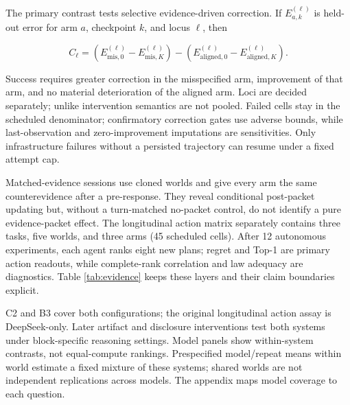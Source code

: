\documentclass{article}
\begin{document}
The primary contrast tests selective evidence-driven correction. If
\(E_{a,k}^{(\ell)}\) is held-out error for arm \(a\), checkpoint \(k\),
and locus \(\ell\), then

\[
C_{\ell}=\left(E^{(\ell)}_{\mathrm{mis},0}-E^{(\ell)}_{\mathrm{mis},K}\right)
-\left(E^{(\ell)}_{\mathrm{aligned},0}-E^{(\ell)}_{\mathrm{aligned},K}\right).
\]

Success requires greater correction in the misspecified arm, improvement
of that arm, and no material deterioration of the aligned arm. Loci are
decided separately; unlike intervention semantics are not pooled. Failed
cells stay in the scheduled denominator; confirmatory correction gates
use adverse bounds, while last-observation and zero-improvement
imputations are sensitivities. Only infrastructure failures without a
persisted trajectory can resume under a fixed attempt cap.

Matched-evidence sessions use cloned worlds and give every arm the same
counterevidence after a pre-response. They reveal conditional
post-packet updating but, without a turn-matched no-packet control, do
not identify a pure evidence-packet effect. The longitudinal action
matrix separately contains three tasks, five worlds, and three arms (45
scheduled cells). After 12 autonomous experiments, each agent ranks
eight new plans; regret and Top-1 are primary action readouts, while
complete-rank correlation and law adequacy are diagnostics. Table
\ref{tab:evidence} keeps these layers and their claim boundaries
explicit.

C2 and B3 cover both configurations; the original longitudinal action
assay is DeepSeek-only. Later artifact and disclosure interventions test
both systems under block-specific reasoning settings. Model panels show
within-system contrasts, not equal-compute rankings. Prespecified
model/repeat means within world estimate a fixed mixture of these
systems; shared worlds are not independent replications across models.
The appendix maps model coverage to each question.
\end{document}
